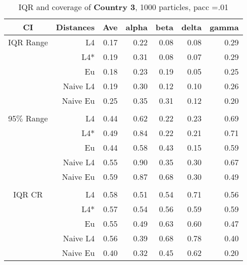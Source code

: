 \documentclass[a4paper,12pt,twoside]{book}
\begin{document}
\begin{table}[H]
\centering
\caption{IQR and coverage of \textbf{Country 3}, 1000 particles, pacc =.01}

\begin{tabular}{crrrrrr}
  \hline
{\color{blue}CI} & Distances & Ave & alpha & beta & delta & gamma \\ 
  \hline
{\color{blue}IQR Range} & L4  &0.17 & 0.22 & 0.08 & 0.08 & 0.29 \\ 
  
&L4*  &0.19 & 0.31 & 0.08 & 0.07 & 0.29 \\ 
  
&Eu &  0.18 & 0.23 & 0.19 & 0.05 & 0.25 \\ 
  
&Naive L4&    0.19 & 0.30 & 0.12 & 0.10 & 0.26 \\  
  
&Naive Eu &     0.25 & 0.35 & 0.31 & 0.12 & 0.20 \\ 
  
 
   \\ 
    {\color{blue}95$\%$ Range} & L4  &0.44 & 0.62 & 0.22 & 0.23 & 0.69 \\ 
  
    &L4*  & 0.49 & 0.84 & 0.22 & 0.21 & 0.71 \\ 
  
&Eu &  0.44 & 0.58 & 0.43 & 0.15 & 0.59 \\ 
  
&Naive L4&     0.55 & 0.90 & 0.35 & 0.30 & 0.67 \\ 
 
&Naive Eu &     0.59 & 0.87 & 0.68 & 0.30 & 0.49 \\ 
  
\\   
   \hline
   
{\color{blue} IQR CR } & L4  &0.58 & 0.51 & 0.54 & 0.71 & 0.56 \\ 
  
&L4*  &    0.57 & 0.54 & 0.56 & 0.59 & 0.59 \\ 
  
&Eu &     0.55 & 0.49 & 0.63 & 0.60 & 0.47 \\ 
  
  
&Naive L4&  0.56 & 0.39 & 0.68 & 0.78 & 0.40 \\ 
&Naive Eu & 0.40 & 0.32 & 0.45 & 0.62 & 0.20 \\ 
  


\end{tabular}
\end{table}
\end{document}

